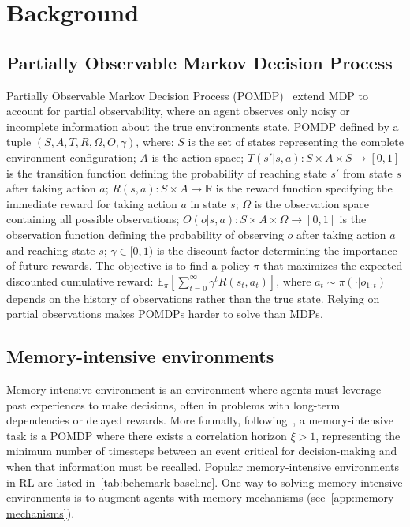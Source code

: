 \section{Background}
\label{sec:background}

\subsection{Partially Observable Markov Decision Process}
\label{app:pomdp}
Partially Observable Markov Decision Process (POMDP)~\citep{pomdp_new} extend MDP to account for partial observability, where an agent observes only noisy or incomplete information about the true environments state. POMDP defined by a tuple $(S,A,T,R,\Omega,O,\gamma)$, where: $S$ is the set of states representing the complete environment configuration; $A$ is the action space; $T(s'|s,a): S \times A \times S \to [0,1]$ is the transition function defining the probability of reaching state $s'$ from state $s$ after taking action $a$; $R(s,a): S \times A \to \mathbb{R}$ is the reward function specifying the immediate reward for taking action $a$ in state $s$; $\Omega$ is the observation space containing all possible observations; $O(o|s,a): S \times A \times \Omega \to [0,1]$ is the observation function defining the probability of observing $o$ after taking action $a$ and reaching state $s$; $\gamma \in [0,1)$ is the discount factor determining the importance of future rewards. The objective is to find a policy $\pi$ that maximizes the expected discounted cumulative reward: $\mathbb{E}_\pi\left[\sum_{t=0}^{\infty} \gamma^t R(s_t,a_t)\right]$, where $a_t \sim \pi(\cdot|o_{1:t})$ depends on the history of observations rather than the true state. Relying on partial observations makes POMDPs harder to solve than MDPs.

\subsection{Memory-intensive environments}
Memory-intensive environment is an environment where agents must leverage past experiences to make decisions, often in problems with long-term dependencies or delayed rewards. More formally, following~\citet{memory_rl}, a memory-intensive task is a POMDP where there exists a correlation horizon $\xi>1$, representing the minimum number of timesteps between an event critical for decision-making and when that information must be recalled. Popular memory-intensive environments in RL are listed in~\autoref{tab:behcmark-baseline}. One way to solving memory-intensive environments is to augment agents with memory mechanisms (see~\autoref{app:memory-mechanisms}). 

